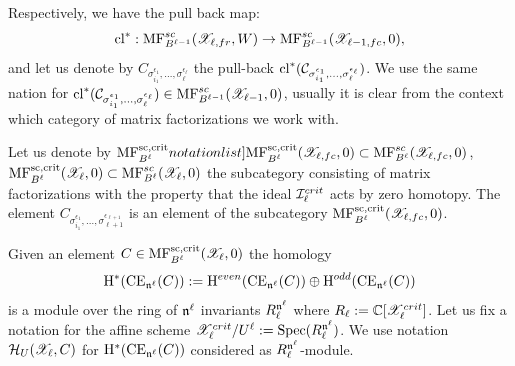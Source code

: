 Respectively, we have the pull back map:
$$\mathrm{cl}^*:\mathrm{MF}^{sc}_{B^{\ell-1}}(\mathscr{X}_{\ell,fr},W)\to \mathrm{MF}^{sc}_{B^{\ell-1}}(\mathscr{X}_{\ell-1,fc},0),$$
and let us denote by $C_{\sigma_{i_1}^{\epsilon_1},\dots,\sigma_\ell^{\epsilon_\ell}}$ the pull-back $\mathrm{cl}^*(\mathcal{C}_{\sigma_{i_1}^{\epsilon_1},\dots,\sigma_\ell^{\epsilon_\ell}})$.
We use the same nation for $\mathrm{cl}^*(\mathcal{C}_{\sigma_{i_1}^{\epsilon_1},\dots,\sigma_\ell^{\epsilon_\ell}})\in \mathrm{MF}^{sc}_{B^{\ell-1}}(\mathscr{X}_{\ell-1},0)$, usually it is clear from the
context which category of matrix factorizations we work with.





Let us denote by
$\SymbolPrint{\MFcrit_{B^\ell}}(\calX_{\ell,fc},0)\subset  \MF_{B^\ell}(\calX_{\ell,fc},0)$, $\mathrm{MF}^{\mathrm{sc,crit}}_{B^\ell}(\mathscr{X}_{\ell},0)\subset  \mathrm{MF}^{sc}_{B^\ell}(\mathscr{X}_{\ell},0)$
the subcategory consisting  of  matrix factorizations
with the property that the ideal $\mathcal{I}^{crit}_\ell$ acts by zero homotopy. The element $C_{\sigma_{i_1}^{\epsilon_1},\dots,\sigma_{\ell+1}^{\epsilon_{\ell+1}}}$ is an element of
the subcategory $\mathrm{MF}^{\mathrm{sc,crit}}_{B^\ell}(\mathscr{X}_{\ell,fc},0)$.

Given an element $C\in \mathrm{MF}^{\mathrm{sc,crit}}_{B^\ell}(\mathscr{X}_{\ell},0)$ the homology $$\mathrm{H}^{*}(\mathrm{CE}_{\mathfrak{n}^\ell}(C)):=\mathrm{H}^{even}(\mathrm{CE}_{\mathfrak{n}^\ell}(C))
\oplus\mathrm{H}^{odd}(\mathrm{CE}_{\mathfrak{n}^\ell}(C))$$ is
a module over the ring of $\mathfrak{n}^\ell$ invariants $R_\ell^{\mathfrak{n}^\ell}$ where $R_\ell:=\mathbb{C}[\mathscr{X}_{\ell}^{crit}]$.  Let us fix a notation for  the affine scheme $\mathscr{X}^{crit}_{\ell}/U^\ell:=\mathrm{Spec}(R_{\ell}^{\mathfrak{n}^\ell})$.  We use notation $\mathcal{H}_U(\mathscr{X}_{\ell},C)$ for $\mathrm{H}^{*}(\mathrm{CE}_{\mathfrak{n}^\ell}(C))$ considered as
$R_\ell^{\mathfrak{n}^\ell}$-module.

